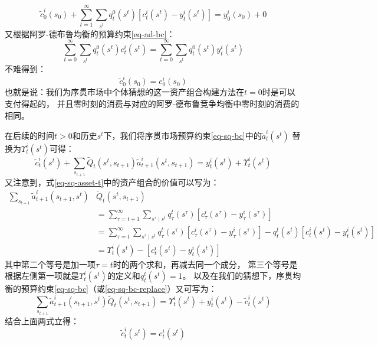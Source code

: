 \begin{equation*}
    \tilde{c}_0^i\left(s_0\right)+
        \sum_{t=1}^{\infty} \sum_{s^t} q_t^0\left(s^t\right)\left[c_t^i\left(s^t\right)-y_t^i\left(s^t\right)\right]
            =y_0^i\left(s_0\right)+0
\end{equation*}
又根据阿罗-德布鲁均衡的预算约束\ref{eq-ad-bc}：
\begin{equation*}
    \sum_{t=0}^{\infty} \sum_{s^t} q_t^0\left(s^t\right) c_t^i\left(s^t\right) 
        = \sum_{t=0}^{\infty} \sum_{s^t} q_t^0\left(s^t\right) y_t^i\left(s^t\right)
\end{equation*}
不难得到：
\begin{equation*}
    \tilde{c}_0^i\left(s_0\right)=c_0^i\left(s_0\right)
\end{equation*}
也就是说：我们为序贯市场中个体猜想的这一资产组合构建方法在$t=0$时是可以支付得起的，
并且零时刻的消费与对应的阿罗-德布鲁竞争均衡中零时刻的消费的相同。

在后续的时间$t>0$和历史$s^t$下，我们将序贯市场预算约束\ref{eq-sq-bc}中的$\tilde{a}_t^i\left(s^t\right)$
替换为$\Upsilon_{t}^i\left(s^{t}\right)$可得：
\begin{equation}   \label{eq-sq-bc-replace}
    \tilde{c}_t^i\left(s^t\right)+\sum_{s_{t+1}} \tilde{Q}_t\left(s^t, s_{t+1}\right) \tilde{a}_{t+1}^i\left(s^t, s_{t+1}\right) 
        = y_t^i\left(s^t\right)+\Upsilon_{t}^i\left(s^{t}\right)
\end{equation}
又注意到，式\ref{eq-sq-asset-t}中的资产组合的价值可以写为：
\begin{equation}    \label{eq-sq-asset-t-lhs}
    \begin{aligned}
        \sum_{s_{t+1}} \tilde{a}_{t+1}^i\left(s_{t+1}, s^t\right) &\tilde{Q}_t\left(s^t, s_{t+1}\right) \\
            &= \sum_{\tau=t+1}^{\infty} \sum_{s^\tau \mid s^t} q_\tau^t\left(s^\tau\right)
                \left[c_\tau^i\left(s^\tau\right)-y_\tau^i\left(s^\tau\right)\right]    \\
            &= \sum_{\tau=t}^{\infty} \sum_{s^\tau \mid s^t} q_\tau^t\left(s^\tau\right)
                \left[c_\tau^i\left(s^\tau\right)-y_\tau^i\left(s^\tau\right)\right] 
                    - q_t^t\left(s^t\right)\left[c_t^i\left(s^t\right)-y_t^i\left(s^t\right)\right] \\
            &= \Upsilon_t^i\left(s^t\right)-\left[c_t^i\left(s^t\right)-y_t^i\left(s^t\right)\right]
    \end{aligned}
\end{equation}
其中第二个等号是加一项$\tau=t$时的两个求和，再减去同一个成分，
第三个等号是根据左侧第一项就是$\Upsilon_t^i\left(s^t\right)$的定义和$q_t^t\left(s^t\right)=1$。
以及在我们的猜想下，序贯均衡的预算约束\ref{eq-sq-bc}（或\ref{eq-sq-bc-replace}）又可写为：
\begin{equation*}
    \sum_{s_{t+1}} \tilde{a}_{t+1}^i\left(s_{t+1}, s^t\right) \tilde{Q}_t\left(s^t, s_{t+1}\right)
        =\Upsilon_t^i\left(s^t\right) + y_t^i\left(s^t\right) - \tilde{c}_t^i\left(s^t\right)
\end{equation*}
结合上面两式立得：
\begin{equation*}
    \tilde{c}_t^i\left(s^t\right)=c_t^i\left(s^t\right)
\end{equation*}

